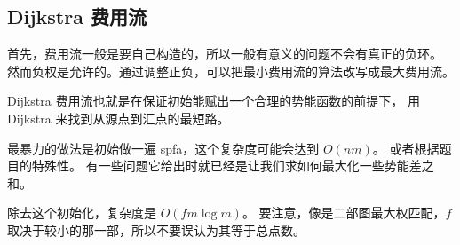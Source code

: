 
\subsection{Dijkstra 费用流}

首先，费用流一般是要自己构造的，所以一般有意义的问题不会有真正的负环。
然而负权是允许的。通过调整正负，可以把最小费用流的算法改写成最大费用流。

Dijkstra 费用流也就是在保证初始能赋出一个合理的势能函数的前提下，
用 Dijkstra 来找到从源点到汇点的最短路。

最暴力的做法是初始做一遍 spfa，这个复杂度可能会达到 $O(n m)$。
或者根据题目的特殊性。
有一些问题它给出时就已经是让我们求如何最大化一些势能差之和。

除去这个初始化，复杂度是 $O(f m \log m)$。
要注意，像是二部图最大权匹配，$f$ 取决于较小的那一部，所以不要误认为其等于总点数。




